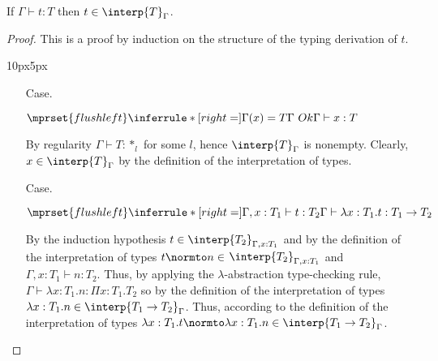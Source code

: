 \begin{thm}
  If $\Gamma \vdash t:T$ then $t \in \interp{T}_\Gamma$.
  \label{thm:soundness_ssf}
\end{thm}
\begin{proof}
  This is a proof by induction on the structure of the typing
  derivation of $t$.
\vspace{-25px}
\begin{changemargin}{10px}{5px}\noindent
\begin{itemize}
\item[Case.]\ \\
  \begin{center}
    \begin{math}
      $$\mprset{flushleft}
      \inferrule* [right=] {
        \Gamma(x) = T
        \\
        \Gamma\ Ok
      }{\Gamma \vdash x:T}
    \end{math}
  \end{center}
  By regularity $\Gamma \vdash T:*_l$ for some $l$, hence $\interp{T}_\Gamma$ is nonempty.
  Clearly, $x \in \interp{T}_\Gamma$ by the definition of the interpretation of types.
  
\item[Case.]\ \\
  \begin{center}
    \begin{math}
      $$\mprset{flushleft}
      \inferrule* [right=] {
        \Gamma,x:T_1 \vdash t:T_2
      }{\Gamma \vdash \lambda x:T_1.t : T_1 \rightarrow T_2}
    \end{math}
  \end{center}
  By the induction hypothesis $t \in
  \interp{T_2}_{\Gamma,x:T_1}$ and by the definition of the
  interpretation of types $t \normto n \in $ 
  $\interp{T_2}_{\Gamma,x:T_1}$ and $\Gamma, x:T_1 \vdash
  n:T_2$.  Thus, by applying the $\lambda$-abstraction type-checking
  rule, $\Gamma \vdash \lambda x:T_1.n:\Pi x:T_1.T_2$ so 
  by the definition of the interpretation of types $\lambda x:T_1.n
  \in \interp{T_1 \rightarrow T_2}_\Gamma$.  Thus, according to the
  definition of the interpretation of types $\lambda x:T_1.t
  \normto \lambda x:T_1.n \in \interp{T_1 \rightarrow T_2}_\Gamma$.


\end{itemize}
\end{changemargin}
\end{proof}
